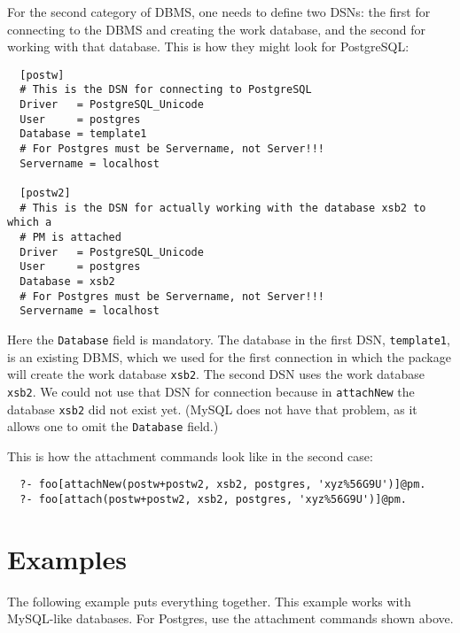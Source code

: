 For the second category of DBMS, one needs
to define two DSNs: the first for connecting to the DBMS and creating the
work database, and the second for working with that database.
This is how they might look for PostgreSQL:
\begin{verbatim}
  [postw]
  # This is the DSN for connecting to PostgreSQL
  Driver   = PostgreSQL_Unicode
  User     = postgres
  Database = template1
  # For Postgres must be Servername, not Server!!!
  Servername = localhost

  [postw2]
  # This is the DSN for actually working with the database xsb2 to which a
  # PM is attached
  Driver   = PostgreSQL_Unicode
  User     = postgres
  Database = xsb2
  # For Postgres must be Servername, not Server!!!
  Servername = localhost
\end{verbatim}
Here the \texttt{Database} field is mandatory. The database in the first
DSN,
\texttt{template1}, is an existing DBMS, which we used for the first
connection in which the package will create the work database \texttt{xsb2}.
The second DSN uses the work database \texttt{xsb2}. We could not use 
that DSN for connection because in \texttt{attachNew} the database
\texttt{xsb2} did not exist yet. (MySQL does not have that problem, as it
allows one to omit the \texttt{Database} field.)

This is how the attachment commands look like in the second case:
\begin{verbatim}
  ?- foo[attachNew(postw+postw2, xsb2, postgres, 'xyz%56G9U')]@pm.
  ?- foo[attach(postw+postw2, xsb2, postgres, 'xyz%56G9U')]@pm.
\end{verbatim}


\section{Examples}

The following example puts everything together.
This example works with MySQL-like databases.
For Postgres, use the attachment commands shown above.

